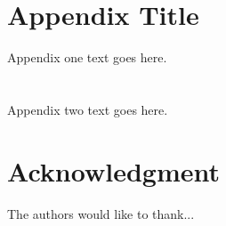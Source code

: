 \documentclass[journal]{IEEEtran}
\begin{document}

%


\appendices
\section{Appendix Title}
Appendix one text goes here.

\section{}
Appendix two text goes here.


\section*{Acknowledgment}


The authors would like to thank...


\ifCLASSOPTIONcaptionsoff
  \newpage
\fi



\end{document}
